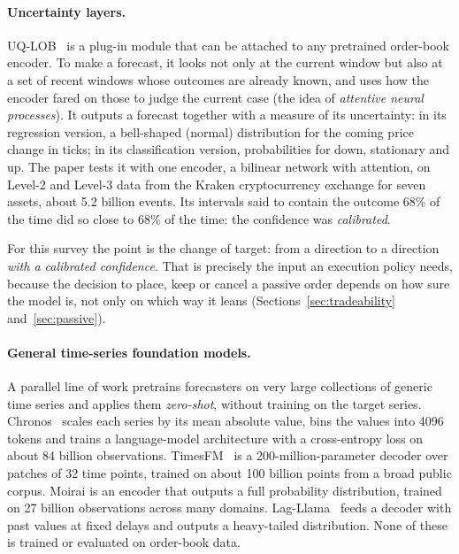 \paragraph{Uncertainty layers.} UQ-LOB~\citep{manoharan2026uqlob} is a plug-in module that can be attached to any
pretrained order-book encoder. To make a forecast, it looks not only at the current window but also at a set of
recent windows whose outcomes are already known, and uses how the encoder fared on those to judge the current case
(the idea of \emph{attentive neural processes}). It outputs a forecast together with a measure of its uncertainty:
in its regression version, a bell-shaped (normal) distribution for the coming price change in ticks; in its
classification version, probabilities for down, stationary and up. The paper tests it with one encoder, a bilinear
network with attention, on Level-2 and Level-3 data from the Kraken cryptocurrency exchange for seven assets, about
5.2 billion events. Its intervals said to contain the outcome 68\% of the time did so close to 68\% of the time: the
confidence was \emph{calibrated}.

For this survey the point is the change of target: from a direction to a direction \emph{with a
calibrated confidence}. That is precisely the input an execution policy needs, because the
decision to place, keep or cancel a passive order depends on how sure the model is, not only on
which way it leans (Sections~\ref{sec:tradeability} and~\ref{sec:passive}).

\paragraph{General time-series foundation models.} A parallel line of work pretrains forecasters on
very large collections of generic time series and applies them \emph{zero-shot}, without training on
the target series. Chronos~\citep{chronos2024} scales each series by its mean absolute value, bins the
values into 4096 tokens and trains a language-model architecture with a cross-entropy loss on about 84
billion observations. TimesFM~\citep{timesfm2024} is a 200-million-parameter decoder over patches of 32
time points, trained on about 100 billion points from a broad public corpus. Moirai
\citep{moirai2024} is an encoder that outputs a full probability distribution, trained on 27 billion
observations across many domains. Lag-Llama~\citep{lagllama2023} feeds a decoder with past
values at fixed delays and outputs a heavy-tailed distribution. None of these is trained or
evaluated on order-book data.

